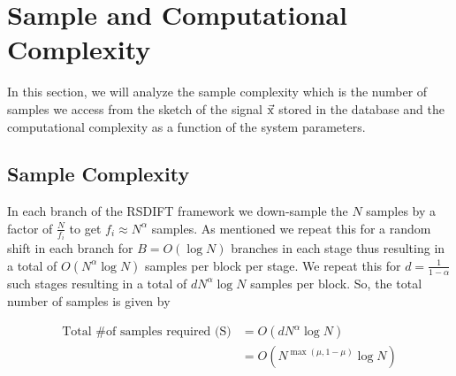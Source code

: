 \section{Sample and Computational Complexity}
In this section, we will analyze the sample complexity which is the  number of samples we access from the sketch of the signal $\vec{\mathrm{x}}$ stored in the database and the computational complexity as a function of the system parameters.

\subsection{\bf Sample Complexity}
In each branch of the RSDIFT framework we down-sample the $N$ samples by a factor of $\frac{N}{f_i}$ to get $f_i\approx N^{\alpha}$ samples. As mentioned we repeat this for a random shift in each branch for $B=O(\log N)$ branches in each stage thus resulting in a total of $O(N^{\alpha}\log N)$ samples per block per stage. We repeat this for $d = \frac{1}{1-\alpha}$ such stages resulting in a total of $dN^{\alpha}\log N$ samples per block. So, the total number of samples is given by  

\begin{align*}
\text{Total \# of samples required (S)} &= O \left(dN^{\alpha}\log N\right)\\
   &=   O(N^{\max(\mu,1-\mu)}\log N)
\end{align*}




